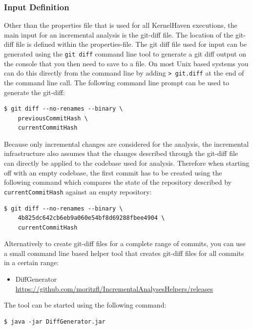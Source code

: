 \documentclass[a4paper]{article}
\begin{document}
\subsubsection{Input Definition}

Other than the properties file that is used for all KernelHaven executions, the main input for an incremental analysis is the git-diff file. The location of the git-diff file is defined within the properties-file. The git diff file used for input can be generated using the \texttt{git diff} command line tool to generate a git diff output on the console that you then need to save to a file. On most Unix based systems you can do this directly from the command line by adding \texttt{> git.diff} at the end of the command line call. The following command line prompt can be used to generate the git-diff:

\begin{lstlisting}
$ git diff --no-renames --binary \ 
    previousCommitHash \ 
    currentCommitHash
\end{lstlisting}

Because only incremental changes are considered for the analysis, the incremental infrastructure also assumes that the changes described through the git-diff file can directly be applied to the codebase used for analysis. Therefore when starting off with an empty codebase, the first commit has to be created using the following command which compares the state of the repository described by \texttt{currentCommitHash} against an empty repository:

\begin{lstlisting}
$ git diff --no-renames --binary \
    4b825dc642cb6eb9a060e54bf8d69288fbee4904 \
    currentCommitHash
\end{lstlisting}

Alternatively to create git-diff files for a complete range of commits, you can use a small command line based helper tool that creates git-diff files for all commits in a certain range:
\begin{itemize}
	\item DiffGenerator \\
	   \url{https://github.com/moritzfl/IncrementalAnalysesHelpers/releases}
\end{itemize}

The tool can be started using the following command:

\begin{lstlisting}
$ java -jar DiffGenerator.jar
\end{lstlisting}
\end{document}
